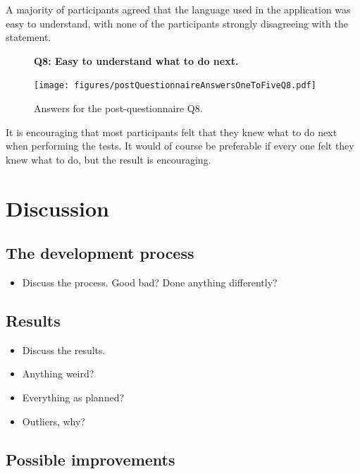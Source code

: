 \documentclass[nofilelist,dvipsnames]{cslthse-msc}
\begin{document}
        A majority of participants agreed that the language used in the
        application was easy to understand, with none of the participants
        strongly disagreeing with the statement.

				\begin{figure}[h!]
          \textbf{Q8: Easy to understand what to do next.}
          \begin{center}
            \texttt{[image: figures/postQuestionnaireAnswersOneToFiveQ8.pdf]}
            \vspace{-1cm}
            \caption{Answers for the post-questionnaire Q8.}
          \end{center}
				\end{figure}

        It is encouraging that most participants felt that they knew what to do
        next when performing the tests. It would of course be preferable if
        every one felt they knew what to do, but the result is encouraging.

		\section{Discussion}

      \subsection{The development process}


        \begin{itemize}
          \item{Discuss the process. Good bad? Done anything differently?}
        \end{itemize}

      \subsection{Results}

        \begin{itemize}
          \item{Discuss the results.}
          \item{Anything weird?}
          \item{Everything as planned?}
          \item{Outliers, why?}
        \end{itemize}

			\subsection{Possible improvements}
\end{document}
